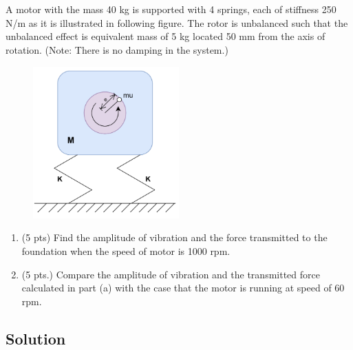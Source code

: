 \section{}
A motor with the mass 40 kg is supported with 4 springs, each of stiffness 250 N/m as it is illustrated in following figure. The rotor is unbalanced such that the unbalanced effect is equivalent mass of 5 kg located 50 mm from the axis of rotation. (Note: There is no damping in the system.)

\begin{figure}[h]
    \centering
    \includegraphics[width=0.5\textwidth]{Questions/Figures/q5 problem diagram.png}
\end{figure}

\begin{enumerate}[label=(\alph*)]
    \item (5 pts) Find the amplitude of vibration and the force transmitted to the foundation when the speed of motor is 1000 rpm.
    \item (5 pts.) Compare the amplitude of vibration and the transmitted force calculated in part (a) with the case that the motor is running at speed of 60 rpm.
\end{enumerate}

\subsection*{Solution}
